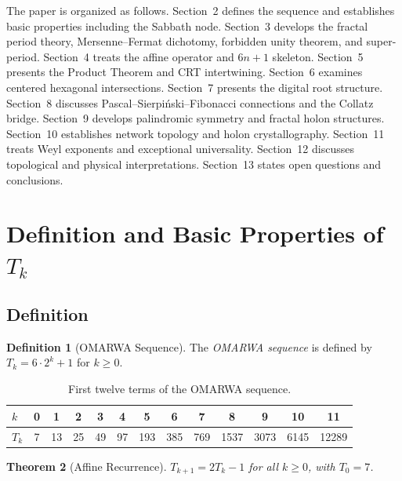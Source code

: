 \documentclass[11pt, a4paper]{article}
\theoremstyle{plain}
\newtheorem{theorem}{Theorem}[section]
\theoremstyle{definition}
\newtheorem{definition}[theorem]{Definition}
\theoremstyle{remark}
\begin{document}
The paper is organized as follows.
Section~2 defines the sequence and establishes basic properties
including the Sabbath node.
Section~3 develops the fractal period theory, Mersenne--Fermat
dichotomy, forbidden unity theorem, and super-period.
Section~4 treats the affine operator and $6n{+}1$ skeleton.
Section~5 presents the Product Theorem and CRT intertwining.
Section~6 examines centered hexagonal intersections.
Section~7 presents the digital root structure.
Section~8 discusses Pascal--Sierpi\'nski--Fibonacci connections and the
Collatz bridge.
Section~9 develops palindromic symmetry and fractal holon structures.
Section~10 establishes network topology and holon crystallography.
Section~11 treats Weyl exponents and exceptional universality.
Section~12 discusses topological and physical interpretations.
Section~13 states open questions and conclusions.

\section{Definition and Basic Properties of \texorpdfstring{$T_k$}{Tk}}

\subsection{Definition}

\begin{definition}[OMARWA Sequence]\label{def:omarwa}
The \emph{OMARWA sequence} is defined by $T_k = 6 \cdot 2^k + 1$ for
$k \geq 0$.
\end{definition}

\begin{table}[H]
\centering
\caption{First twelve terms of the OMARWA sequence.}\label{tab:terms}
\smallskip
\begin{tabular}{@{}l*{12}{c}@{}}
\toprule
$k$   & 0 & 1  & 2  & 3  & 4  & 5   & 6   & 7   & 8    & 9    & 10   & 11   \\
\midrule
$T_k$ & 7 & 13 & 25 & 49 & 97 & 193 & 385 & 769 & 1537 & 3073 & 6145 & 12289 \\
\bottomrule
\end{tabular}
\end{table}

\begin{theorem}[Affine Recurrence]\label{thm:recurrence}
$T_{k+1} = 2T_k - 1$ for all $k \geq 0$, with $T_0 = 7$.
\end{theorem}
\end{document}
